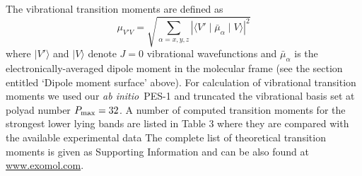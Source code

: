 \documentclass{achemso}
\newcommand{\red}[1]{{\color{red} #1}}
\newcommand{\3}{$_{3}$}
\newcommand{\abinitio}{\textit{ab initio}}
\begin{document}






The vibrational transition moments are defined as
\begin{equation}\label{e:vib:mu}
 \mu_{V'V} = \sqrt{\sum_{\alpha=x,y,z} | \langle V'\mid \bar\mu_\alpha \mid V \rangle |^2 }
\end{equation}
 where $|V'\rangle$ and $|V\rangle$ denote $J=0$ vibrational wavefunctions and $\bar\mu_\alpha$ is the electronically-averaged dipole moment in the molecular frame (see the section entitled `Dipole moment surface' above).
 For calculation of vibrational transition moments we used our \abinitio\ PES-1 and truncated the vibrational basis set at polyad number $P_{\rm max}=32$.
A number of computed transition moments for the strongest lower lying bands are listed in Table 3 where they are compared with the available experimental data
 The complete list of theoretical transition moments is given as Supporting Information and can be also found at \url{www.exomol.com}.



\end{document}
